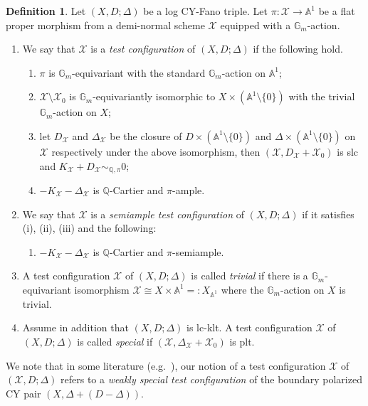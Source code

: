 \documentclass[reqno, 12pt]{amsart}
\theoremstyle{definition}
\newtheorem{defn}[prop]{Definition}
\newcommand{\bA}{\mathbb{A}}
\newcommand{\bQ}{\mathbb{Q}}
\newcommand{\bG}{\mathbb{G}}
\newcommand{\cX}{\mathcal{X}}
\numberwithin{equation}{section}
\begin{document}
\begin{defn}
Let $(X,D;\Delta)$ be a log CY-Fano triple. 
Let  $\pi: \cX \to \bA^1$ be a flat proper morphism from a demi-normal scheme $\cX$ equipped with a $\bG_m$-action.
\begin{enumerate}
    \item We say that $\cX$ is a \emph{test configuration} of $(X,D;\Delta)$ if the following hold.
\begin{enumerate}[label=(\roman*)]
    \item $\pi$ is $\bG_m$-equivariant with  the standard $\bG_m$-action on $\bA^1$;
    \item $\cX\setminus \cX_0$ is $\bG_m$-equivariantly isomorphic to $X\times (\bA^1\setminus \{0\})$ with the trivial $\bG_m$-action on $X$;
    \item let $D_{\cX}$ and $\Delta_{\cX}$ be the closure of $D\times (\bA^1\setminus \{0\})$ and $\Delta\times (\bA^1\setminus \{0\})$ on $\cX$ respectively under the above isomorphism, then $(\cX, D_{\cX}+\cX_0)$ is slc and $K_{\cX}+D_{\cX}\sim_{\bQ,\pi} 0$;    
    \item $-K_{\cX} - \Delta_{\cX}$ is $\bQ$-Cartier and $\pi$-ample.
\end{enumerate}

\item We say that $\cX$ is a \emph{semiample test configuration} of $(X, D;\Delta)$ if it satisfies (i), (ii), (iii) and the following:
\begin{enumerate}
    \item[(iv')] $-K_{\cX}-\Delta_{\cX}$ is $\bQ$-Cartier and $\pi$-semiample. 
\end{enumerate}


\item A test configuration $\cX$ of $(X,D;\Delta)$ is called \emph{trivial} if there is a $\bG_m$-equivariant isomorphism $\cX \cong X\times \bA^1=: X_{\bA^1}$ where the $\bG_m$-action on $X$ is trivial.

\item Assume in addition that $(X,D;\Delta)$ is lc-klt. A test configuration $\cX$ of $(X,D;\Delta)$ is called \emph{special} if $(\cX, \Delta_{\cX}+\cX_0)$ is plt.
\end{enumerate}



\end{defn}



We note that in some literature (e.g.\ \cite{BLX22, BABWILD, BL24}), our notion of a test configuration $\cX$ of $(\cX,D;\Delta)$ refers to a \emph{weakly special test configuration} of the boundary polarized CY pair $(X,\Delta +(D-\Delta))$.
\end{document}
